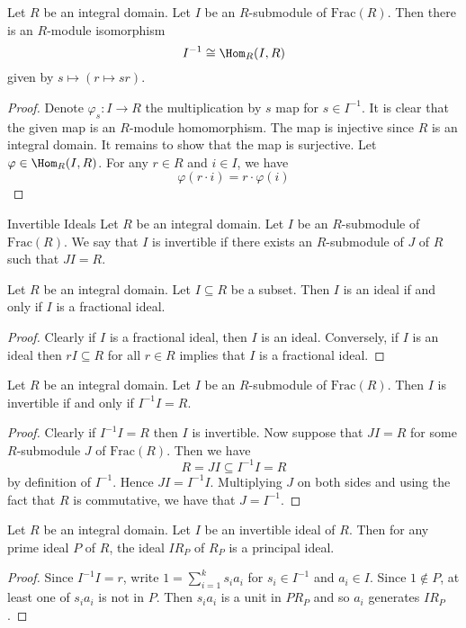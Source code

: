 \documentclass[a4paper]{article}
\begin{document}
\begin{lmm}{}{} Let $R$ be an integral domain. Let $I$ be an $R$-submodule of $\text{Frac}(R)$. Then there is an $R$-module isomorphism $$I^{-1}\cong\Hom_R(I,R)$$ given by $s\mapsto(r\mapsto sr)$. \tcbline
\begin{proof}
Denote $\varphi_s:I\to R$ the multiplication by $s$ map for $s\in I^{-1}$. It is clear that the given map is an $R$-module homomorphism. The map is injective since $R$ is an integral domain. It remains to show that the map is surjective. Let $\varphi\in\Hom_R(I,R)$. For any $r\in R$ and $i\in I$, we have $$\varphi(r\cdot i)=r\cdot\varphi(i)$$
\end{proof}
\end{lmm}

\begin{defn}{Invertible Ideals}{} Let $R$ be an integral domain. Let $I$ be an $R$-submodule of $\text{Frac}(R)$. We say that $I$ is invertible if there exists an $R$-submodule of $J$ of $R$ such that $JI=R$. 
\end{defn}

\begin{lmm}{}{} Let $R$ be an integral domain. Let $I\subseteq R$ be a subset. Then $I$ is an ideal if and only if $I$ is a fractional ideal. \tcbline
\begin{proof}
Clearly if $I$ is a fractional ideal, then $I$ is an ideal. Conversely, if $I$ is an ideal then $rI\subseteq R$ for all $r\in R$ implies that $I$ is a fractional ideal. 
\end{proof}
\end{lmm}

\begin{prp}{}{} Let $R$ be an integral domain. Let $I$ be an $R$-submodule of $\text{Frac}(R)$. Then $I$ is invertible if and only if $I^{-1}I=R$. \tcbline
\begin{proof}
Clearly if $I^{-1}I=R$ then $I$ is invertible. Now suppose that $JI=R$ for some $R$-submodule $J$ of $\text{Frac}(R)$. Then we have $$R=JI\subseteq I^{-1}I=R$$ by definition of $I^{-1}$. Hence $JI=I^{-1}I$. Multiplying $J$ on both sides and using the fact that $R$ is commutative, we have that $J=I^{-1}$. 
\end{proof}
\end{prp}

\begin{lmm}{}{} Let $R$ be an integral domain. Let $I$ be an invertible ideal of $R$. Then for any prime ideal $P$ of $R$, the ideal $IR_P$ of $R_P$ is a principal ideal. \tcbline
\begin{proof}
Since $I^{-1}I=r$, write $1=\sum_{i=1}^ks_ia_i$ for $s_i\in I^{-1}$ and $a_i\in I$. Since $1\notin P$, at least one of $s_ia_i$ is not in $P$. Then $s_ia_i$ is a unit in $PR_P$ and so $a_i$ generates $IR_P$. 
\end{proof}
\end{lmm}
\end{document}
